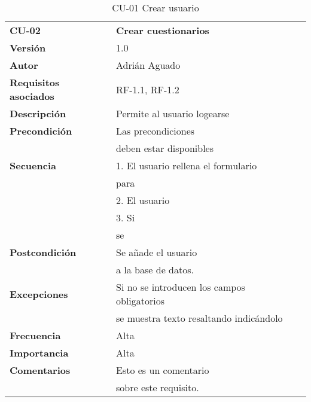 \begin{table}
\begin{tabular}{llr}  
\toprule
\begin{minipage}[b]{0.23\columnwidth}\raggedright\strut
\textbf{CU-02}\strut
\end{minipage} & \begin{minipage}[b]{0.71\columnwidth}\raggedright\strut
\textbf{Crear cuestionarios}\strut
\end{minipage}\tabularnewline
\cmidrule(r){1-2}
\textbf{Versión}       & 1.0           \\
\textbf{Autor}       & Adrián  Aguado    \\
\textbf{Requisitos asociados}       & RF-1.1, RF-1.2 \\ 
\textbf{Descripción} & Permite al usuario logearse\\
\textbf{Precondición} & Las precondiciones \\
& deben estar disponibles        \\
\textbf{Secuencia} & 1. El usuario rellena el formulario \\
& para\\
& 2. El usuario \\
& 3. Si\\
& se        \\
\textbf{Postcondición} & Se añade el usuario \\
& a la base de datos.     \\
\textbf{Excepciones} &  Si no se introducen los campos obligatorios \\
& se muestra texto resaltando indicándolo
          \\
\textbf{Frecuencia} & Alta            \\
\textbf{Importancia} & Alta            \\
\textbf{Comentarios } & Esto es un comentario        \\
& sobre este requisito.     \\
\bottomrule
\end{tabular}
\caption{CU-01 Crear usuario} \label{tab:sometab}
\end{table}